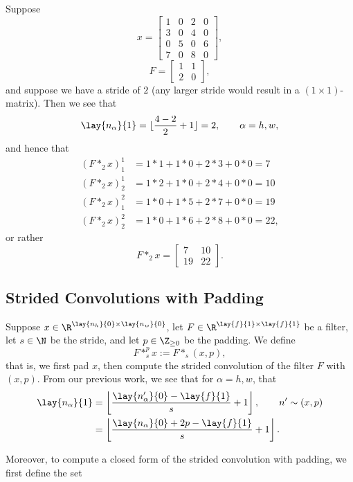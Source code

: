 \begin{ex}
	Suppose
	$$x=\begin{bmatrix}
		1&0&2&0\\
		3&0&4&0\\
		0&5&0&6\\
		7&0&8&0
	\end{bmatrix},$$
	$$F=\begin{bmatrix}
		1&1\\
		2&0
	\end{bmatrix},$$
	and suppose we have a stride of $2$ (any larger stride would result in a $(1\times 1)$-matrix).  Then we see that
	$$\lay{n_\alpha}{1}=\lfloor\frac{4-2}{2}+1\rfloor=2,\qquad \alpha=h,w,$$
	and hence that
	\begin{align*}
		(F*_2x)^1_1&=1*1+1*0+2*3+0*0=7\\
		(F*_2x)^1_2&=1*2+1*0+2*4+0*0=10\\
		(F*_2x)^2_1&=1*0+1*5+2*7+0*0=19\\
		(F*_2x)^2_2&=1*0+1*6+2*8+0*0=22,
	\end{align*}
	or rather
	$$F*_2x=\begin{bmatrix}
		7&10\\
		19&22
	\end{bmatrix}.$$
\end{ex}



\subsection{Strided Convolutions with Padding}

Suppose $x\in\R^{\lay{n_h}{0}\times \lay{n_w}{0}}$, let $F\in\R^{\lay{f}{1}\times\lay{f}{1}}$ be a filter, let $s\in\N$ be the stride, and let $p\in\Z_{\geq0}$ be the padding.  We define
$$F*_s^px:=F*_s(x,p),$$
that is, we first pad $x$, then compute the strided convolution of the filter $F$ with $(x,p)$.  From our previous work, we see that for $\alpha=h,w$, that
\begin{align*}
	\lay{n_\alpha}{1}&=\left\lfloor\frac{\lay{n'_\alpha}{0}-\lay{f}{1}}{s}+1\right\rfloor,\qquad n'\sim (x,p)\\
	&=\left\lfloor\frac{\lay{n_\alpha}{0}+2p-\lay{f}{1}}{s}+1\right\rfloor.
\end{align*}

Moreover, to compute a closed form of the strided convolution with padding, we first define the set

